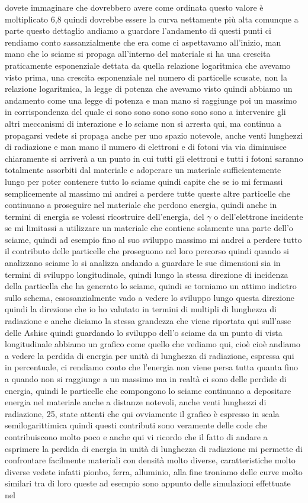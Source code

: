 {dovete immaginare che dovrebbero avere come ordinata questo valore è moltiplicato 6,8 quindi dovrebbe essere la curva nettamente più alta comunque a parte questo dettaglio andiamo a guardare l'andamento di questi punti ci rendiamo conto sassanzialmente che era come ci aspettavamo all'inizio, man mano che lo sciame si propaga all'interno del materiale si ha una crescita praticamente esponenziale dettata da quella relazione logaritmica che avevamo visto prima, una crescita esponenziale nel numero di particelle scusate, non la relazione logaritmica, la legge di potenza che avevamo visto quindi abbiamo un andamento come una legge di potenza e man mano si raggiunge poi un massimo in corrispondenza del quale ci sono sono sono sono sono sono a intervenire gli altri meccanismi di interazione e lo sciame non si arresta qui, ma continua a propagarsi vedete si propaga anche per uno spazio notevole, anche venti lunghezzi di radiazione e man mano il numero di elettroni e di fotoni via via diminuisce chiaramente si arriverà a un punto in cui tutti gli elettroni e tutti i fotoni saranno totalmente assorbiti dal materiale e adoperare un materiale sufficientemente lungo per poter contenere tutto lo sciame quindi capite che se io mi fermassi semplicemente al massimo mi andrei a perdere tutte queste altre particelle che continuano a proseguire nel materiale che perdono energia, quindi anche in termini di energia se volessi ricostruire dell'energia, del $\gamma$ o dell'elettrone incidente se mi limitassi a utilizzare un materiale che contiene solamente una parte dell'o sciame, quindi ad esempio fino al suo sviluppo massimo mi andrei a perdere tutto il contributo delle particelle che proseguono nel loro percorso quindi quando si analizzano sciame lo si analizza andando a guardare le sue dimensioni sia in termini di sviluppo longitudinale, quindi lungo la stessa direzione di incidenza della particella che ha generato lo sciame, quindi se torniamo un attimo indietro sullo schema, essosanzialmente vado a vedere lo sviluppo lungo questa direzione quindi la direzione che io ho valutato in termini di multipli di lunghezza di radiazione e anche diciamo la stessa grandezza che viene riportata qui sull'asse delle Ashise quindi guardando lo sviluppo dell'o sciame da un punto di vista longitudinale abbiamo un grafico come quello che vediamo qui, cioè cioè andiamo a vedere la perdida di energia per unità di lunghezza di radiazione, espressa qui in percentuale, ci rendiamo conto che l'energia non viene persa tutta quanta fino a quando non si raggiunge a un massimo ma in realtà ci sono delle perdide di energia, quindi le particelle che compongono lo sciame continuano a depositare energia nel materiale anche a distanze notevoli, anche venti lunghezzi di radiazione, 25, state attenti che qui ovviamente il grafico è espresso in scala semilogarittimica quindi questi contributi sono veramente delle code che contribuiscono molto poco e anche qui vi ricordo che il fatto di andare a esprimere la perdida di energia in unità di lunghezza di radiazione mi permette di confrontare facilmente materiali con densità molto diverse, caratteristiche molto diverse vedete infatti pionbo, ferra, alluminio, alla fine troniamo delle curve molto similari tra di loro queste ad esempio sono appunto delle simulazioni effettuate nel }
